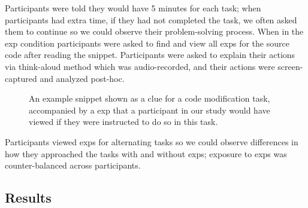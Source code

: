 Participants were told they would have 5 minutes for each task; when participants had extra time, if  they had not completed the task, we often asked them to continue so we could observe their problem-solving process.
When in the \gls{exp} condition participants were asked to find and view all \glspl{exp} for the source code after reading the snippet.
Participants were asked to explain their actions via think-aloud method which was audio-recorded, and their actions were screen-captured and analyzed post-hoc. 


\begin{figure}
\centering
{}
\caption{An example snippet shown as a clue for a code modification task, accompanied by a \gls{exp} that a participant in our study would have viewed if they were instructed to do so in this task.}
\label{fig:study_snippet}
\end{figure}

Participants viewed \glspl{exp} for alternating tasks so we could observe differences in how they approached the tasks with and without \glspl{exp}; exposure to \glspl{exp} was counter-balanced across participants. 


\subsection{Results}

